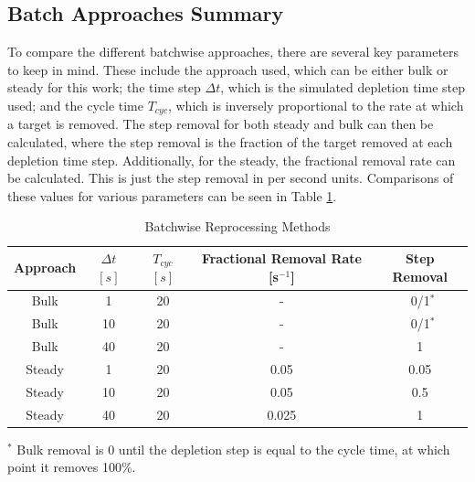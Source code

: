 
\subsection{Batch Approaches Summary}
\label{s:batch-sum}

To compare the different batchwise approaches, there are several key parameters to keep in mind. These include the approach used, which can be either bulk or steady for this work; the time step $\Delta t$, which is the simulated depletion time step used; and the cycle time $T_{cyc}$, which is inversely proportional to the rate at which a target is removed. 
The step removal for both steady and bulk can then be calculated, where the step removal is the fraction of the target removed at each depletion time step.
Additionally, for the steady, the fractional removal rate can be calculated. This is just the step removal in per second units. Comparisons of these values for various parameters can be seen in Table \ref{tab:batch_methods}.

\begin{table}[H]
\renewcommand{\arraystretch}{1.25}
\caption{Batchwise Reprocessing Methods}
\label{tab:batch_methods}
\begin{center}
\begin{tabular}{ c | c | c | c | c }
 \hline
        Approach & $\Delta t$ $[s]$ & $T_{cyc}$ $[s]$ & Fractional Removal Rate [s$^{-1}$] & Step Removal\\
 \hline
 \hline
        Bulk & 1 & 20 & - & \, 0/1$^{*}$\\
        Bulk & 10 & 20 & - & \, 0/1$^{*}$ \\
        Bulk & 40 & 20 & - & 1 \\
        Steady & 1 & 20 & 0.05 & 0.05\\
        Steady & 10 & 20 & 0.05 & 0.5\\
        Steady & 40 & 20 & 0.025 & 1\\
 \hline
\end{tabular}
\end{center}
\end{table}
        \begin{center}
\footnotesize{$^{*}$ Bulk removal is 0 until the depletion step is equal to the cycle time, at which point it removes 100\%.}\\
        \end{center}
        
